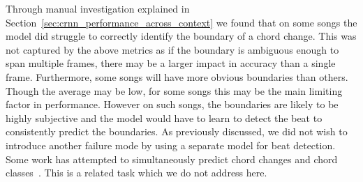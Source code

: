 Through manual investigation explained in Section~\ref{sec:crnn_performance_across_context} we found that on some songs the model did struggle to correctly identify the boundary of a chord change. This was not captured by the above metrics as if the boundary is ambiguous enough to span multiple frames, there may be a larger impact in accuracy than a single frame. Furthermore, some songs will have more obvious boundaries than others. Though the average may be low, for some songs this may be the main limiting factor in performance. However on such songs, the boundaries are likely to be highly subjective and the model would have to learn to detect the beat to consistently predict the boundaries. As previously discussed, we did not wish to introduce another failure mode by using a separate model for beat detection. Some work has attempted to simultaneously predict chord changes and chord classes~\citep{HarmonyTransformer}. This is a related task which we do not address here.


